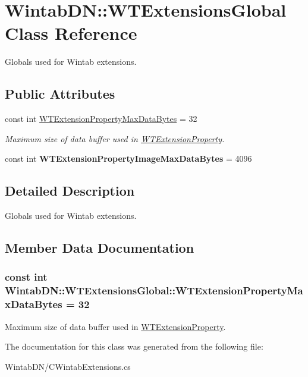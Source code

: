 \hypertarget{class_wintab_d_n_1_1_w_t_extensions_global}{
\section{WintabDN::WTExtensionsGlobal Class Reference}
\label{class_wintab_d_n_1_1_w_t_extensions_global}
}


Globals used for Wintab extensions.  


\subsection*{Public Attributes}
\begin{DoxyCompactItemize}
\item 
const int \hyperlink{class_wintab_d_n_1_1_w_t_extensions_global_ab6504308c6eb61fbed5e1772a9a59197}{WTExtensionPropertyMaxDataBytes} = 32
\begin{DoxyCompactList}\small\item\em Maximum size of data buffer used in \hyperlink{struct_wintab_d_n_1_1_w_t_extension_property}{WTExtensionProperty}. \item\end{DoxyCompactList}\item 
\hypertarget{class_wintab_d_n_1_1_w_t_extensions_global_a8cbc06e85a507f2a7e2f3d3f7662c437}{
const int {\bfseries WTExtensionPropertyImageMaxDataBytes} = 4096}
\label{class_wintab_d_n_1_1_w_t_extensions_global_a8cbc06e85a507f2a7e2f3d3f7662c437}

\end{DoxyCompactItemize}


\subsection{Detailed Description}
Globals used for Wintab extensions. 

\subsection{Member Data Documentation}
\hypertarget{class_wintab_d_n_1_1_w_t_extensions_global_ab6504308c6eb61fbed5e1772a9a59197}{
\subsubsection[{WTExtensionPropertyMaxDataBytes}]{\setlength{\rightskip}{0pt plus 5cm}const int {\bf WintabDN::WTExtensionsGlobal::WTExtensionPropertyMaxDataBytes} = 32}}
\label{class_wintab_d_n_1_1_w_t_extensions_global_ab6504308c6eb61fbed5e1772a9a59197}


Maximum size of data buffer used in \hyperlink{struct_wintab_d_n_1_1_w_t_extension_property}{WTExtensionProperty}. 



The documentation for this class was generated from the following file:\begin{DoxyCompactItemize}
\item 
WintabDN/CWintabExtensions.cs\end{DoxyCompactItemize}

